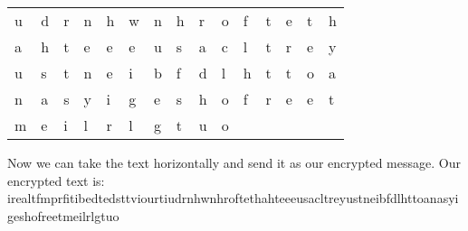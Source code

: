 \documentclass[12pt]{article}
\begin{document}
\begin{enumerate}[label=(\alph*)]
\begin{tabular}{ l l l l l l l l l l l l l l l}
u & d & r & n & h & w & n & h & r &  o & f & t & e & t & h\\
a & h & t & e & e & e & u & s & a & c & l & t & r & e & y\\
u & s & t & n & e & i & b & f & d & l & h & t & t & o & a\\
n & a & s & y & i & g & e & s & h & o & f & r & e & e & t\\
m & e & i & l & r & l & g & t & u & o\\
\end{tabular}
\newline
\newline
Now we can take the text horizontally and send it as our encrypted message. Our encrypted text is:
\newline
irealtfmprfitibedtedsttviourtiudrnhwnhroftethahteeeusacltreyustneibfdlhttoanasyigeshofreetmeilrlgtuo


\end{enumerate}
\end{document}
